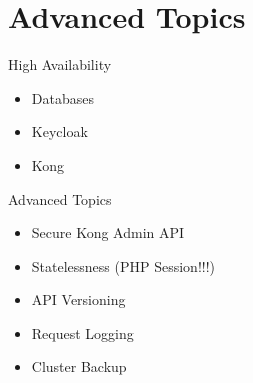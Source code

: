 \section{Advanced Topics}


\begin{frame}{High Availability}
	\begin{itemize}
		\item Databases
		\item Keycloak
		\item Kong
	\end{itemize}
\end{frame}


\begin{frame}{Advanced Topics}
	\begin{itemize}
		\item Secure Kong Admin API
		\item Statelessness (PHP Session!!!)
		\item API Versioning
		\item Request Logging
		\item Cluster Backup
	\end{itemize}
\end{frame}
